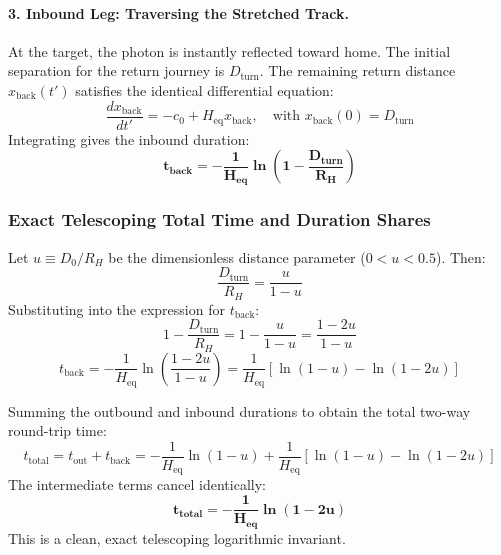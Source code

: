 \documentclass[11pt,a4paper]{article}
\begin{document}
\paragraph{3. Inbound Leg: Traversing the Stretched Track.}
At the target, the photon is instantly reflected toward home. The initial separation for the return journey is $D_{\text{turn}}$.
The remaining return distance $x_{\text{back}}(t')$ satisfies the identical differential equation:
\begin{equation}
\frac{d x_{\text{back}}}{dt'} = -c_0 + H_{\text{eq}} x_{\text{back}}, \quad \text{with } x_{\text{back}}(0) = D_{\text{turn}}
\label{eq:ode_inbound}
\end{equation}
Integrating gives the inbound duration:
\begin{equation}
\mathbf{t_{\text{back}} = -\frac{1}{H_{\text{eq}}} \ln\left(1 - \frac{D_{\text{turn}}}{R_H}\right)}
\label{eq:t_back_solution}
\end{equation}

\subsubsection{Exact Telescoping Total Time and Duration Shares}

Let $u \equiv D_0 / R_H$ be the dimensionless distance parameter ($0 < u < 0.5$). Then:
\begin{equation}
\frac{D_{\text{turn}}}{R_H} = \frac{u}{1 - u}
\end{equation}
Substituting into the expression for $t_{\text{back}}$:
\begin{equation}
1 - \frac{D_{\text{turn}}}{R_H} = 1 - \frac{u}{1 - u} = \frac{1 - 2u}{1 - u}
\end{equation}
\begin{equation}
t_{\text{back}} = -\frac{1}{H_{\text{eq}}} \ln\left(\frac{1 - 2u}{1 - u}\right) = \frac{1}{H_{\text{eq}}}\left[ \ln(1 - u) - \ln(1 - 2u) \right]
\end{equation}

Summing the outbound and inbound durations to obtain the total two-way round-trip time:
\begin{equation}
t_{\text{total}} = t_{\text{out}} + t_{\text{back}} = -\frac{1}{H_{\text{eq}}}\ln(1 - u) + \frac{1}{H_{\text{eq}}}\left[ \ln(1 - u) - \ln(1 - 2u) \right]
\end{equation}
The intermediate terms cancel identically:
\begin{equation}
\mathbf{t_{\text{total}} = -\frac{1}{H_{\text{eq}}} \ln(1 - 2u)}
\label{eq:t_total_telescoping}
\end{equation}
This is a clean, exact telescoping logarithmic invariant.
\end{document}
